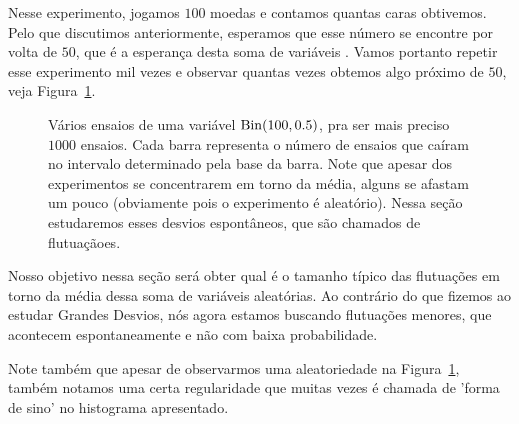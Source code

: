 Nesse experimento, jogamos $100$ moedas e contamos quantas caras obtivemos.
Pelo que discutimos anteriormente, esperamos que esse número se encontre por volta de $50$, que é a esperança desta soma de variáveis \iid.
Vamos portanto repetir esse experimento mil vezes e observar quantas vezes obtemos algo próximo de $50$, veja Figura~\ref{f:histograma_normal}.

\begin{figure}[!ht]
  \centering
  \caption{Vários ensaios de uma variável $\operatorname{Bin}(100,0.5)$, pra ser mais preciso $1000$ ensaios. Cada barra representa o número de ensaios que caíram no intervalo determinado pela base da barra. Note que apesar dos experimentos se concentrarem em torno da média, alguns se afastam um pouco (obviamente pois o experimento é aleatório). Nessa seção estudaremos esses desvios espontâneos, que são chamados de flutuaçãoes. }
  \label{f:histograma_normal}
\end{figure}

Nosso objetivo nessa seção será obter qual é o tamanho típico das flutuações em torno da média dessa soma de variáveis aleatórias.
Ao contrário do que fizemos ao estudar Grandes Desvios, nós agora estamos buscando flutuações menores, que acontecem espontaneamente e não com baixa probabilidade.

Note também que apesar de observarmos uma aleatoriedade na Figura~\ref{f:histograma_normal}, também notamos uma certa regularidade que muitas vezes é chamada de 'forma de sino' no histograma apresentado.

